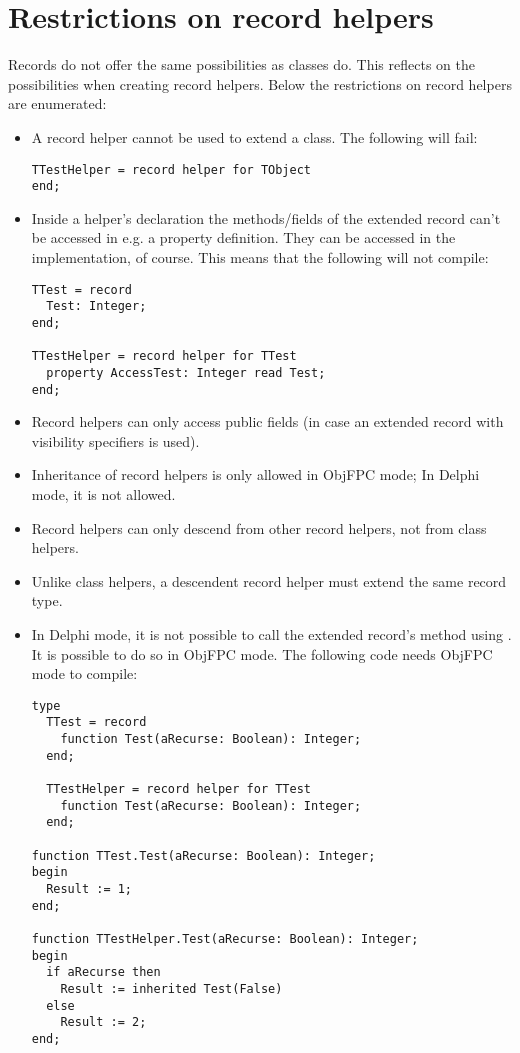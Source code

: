 \section{Restrictions on record helpers}
Records do not offer the same possibilities as classes do. This reflects on
the possibilities when creating record helpers. Below the restrictions on
record helpers are enumerated:
\begin{itemize}
\item A record helper cannot be used to extend a class. The following will
fail:
\begin{verbatim}
TTestHelper = record helper for TObject
end;
\end{verbatim}
\item Inside a helper's declaration the methods/fields of the extended record
can't be accessed in e.g. a property definition. They can be accessed in the 
implementation, of course. This means that the following will not compile:
\begin{verbatim}
TTest = record
  Test: Integer;
end;

TTestHelper = record helper for TTest
  property AccessTest: Integer read Test;
end;
\end{verbatim}
\item Record helpers can only access public fields (in case an extended
record with visibility specifiers is used).
\item Inheritance of record helpers is only allowed in ObjFPC mode; In
Delphi mode, it is not allowed.
\item Record helpers can only descend from other record helpers, not from
class helpers.
\item Unlike class helpers, a descendent record helper must extend the same
record type.
\item In Delphi mode, it is not possible to call the extended record's
method using . It is possible to do so in ObjFPC mode. The
following code needs ObjFPC mode to compile:
\begin{verbatim}
type
  TTest = record
    function Test(aRecurse: Boolean): Integer;
  end;

  TTestHelper = record helper for TTest
    function Test(aRecurse: Boolean): Integer;
  end;

function TTest.Test(aRecurse: Boolean): Integer;
begin
  Result := 1;
end;

function TTestHelper.Test(aRecurse: Boolean): Integer;
begin
  if aRecurse then
    Result := inherited Test(False)
  else
    Result := 2;
end;
\end{verbatim}
\end{itemize}

